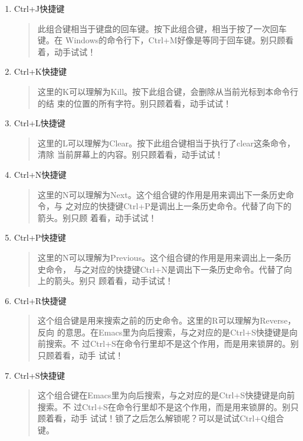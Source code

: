 \begin{enumerate}[itemsep=0pt,parsep=0pt]
\item Ctrl+J快捷键
  \begin{quote}
    此组合键相当于键盘的回车键。按下此组合键，相当于按了一次回车键。在
    Windows的命令行下，Ctrl+M好像是等同于回车键。别只顾看着，动手试试！
  \end{quote}

\item Ctrl+K快捷键
  \begin{quote}
    这里的K可以理解为Kill。按下此组合键，会删除从当前光标到本命令行的结
    束的位置的所有字符。别只顾着看，动手试试！
  \end{quote}

\item Ctrl+L快捷键
  \begin{quote}
    这里的L可以理解为Clear。按下此组合键相当于执行了clear这条命令，清除
    当前屏幕上的内容。别只顾着看，动手试试！
  \end{quote}

\item Ctrl+N快捷键
  \begin{quote}
    这里的N可以理解为Next。这个组合键的作用是用来调出下一条历史命令，与
    之对应的快捷键Ctrl+P是调出上一条历史命令。代替了向下的箭头。别只顾
    着看，动手试试！
  \end{quote}

\item Ctrl+P快捷键
  \begin{quote}
    这里的N可以理解为Previous。这个组合键的作用是用来调出上一条历史命令，
    与之对应的快捷键Ctrl+N是调出下一条历史命令。代替了向上的箭头。别只
    顾着看，动手试试！
  \end{quote}

\item Ctrl+R快捷键
  \begin{quote}
    这个组合键是用来搜索之前的历史命令。这里的R可以理解为Reverse，反向
    的意思。在Emacs里为向后搜索，与之对应的是Ctrl+S快捷键是向前搜索。不
    过Ctrl+S在命令行里却不是这个作用，而是用来锁屏的。别只顾着看，动手
    试试！
  \end{quote}

\item Ctrl+S快捷键
  \begin{quote}
    这个组合键在Emacs里为向后搜索，与之对应的是Ctrl+S快捷键是向前搜索。不
    过Ctrl+S在命令行里却不是这个作用，而是用来锁屏的。别只顾着看，动手
    试试！锁了之后怎么解锁呢？可以是试试Ctrl+Q组合键。
  \end{quote}


\end{enumerate}
